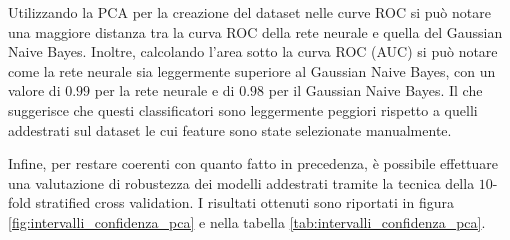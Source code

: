 Utilizzando la PCA per la creazione del dataset nelle curve ROC si può notare
una maggiore distanza tra la curva ROC della rete neurale e quella del Gaussian
Naive Bayes. Inoltre, calcolando l'area sotto la curva ROC (AUC) si può notare
come la rete neurale sia leggermente superiore al Gaussian Naive Bayes, con un
valore di $0.99$ per la rete neurale e di $0.98$ per il Gaussian Naive Bayes. Il
che suggerisce che questi classificatori sono leggermente peggiori rispetto a
quelli addestrati sul dataset le cui feature sono state selezionate manualmente.

Infine, per restare coerenti con quanto fatto in precedenza, è possibile effettuare
una valutazione di robustezza dei modelli addestrati tramite la tecnica della
$10$-fold stratified cross validation.
I risultati ottenuti sono riportati in figura \ref{fig:intervalli_confidenza_pca}
e nella tabella \ref{tab:intervalli_confidenza_pca}.

